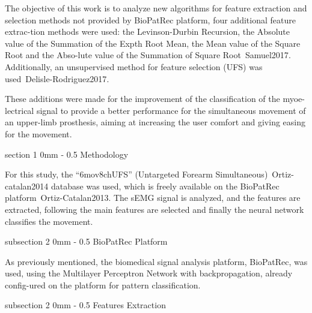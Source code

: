 \documentclass[a4paper, 12pt]{ppgeb}
\makeatletter
\renewcommand{\section}{\@startsection
{section}
{1}
{0mm}
{-\baselineskip}
{0.5\baselineskip}
{\large\bfseries\scshape}}
\renewcommand{\subsection}{\@startsection
{subsection}
{2}
{0mm}
{-\baselineskip}
{0.5\baselineskip}
{\bf\sffamily}}
\makeatother
\begin{document}
The objective of this work is to analyze new algorithms for feature extraction and selection methods not provided by BioPatRec platform, four additional feature extrac-tion methods were used: the Levinson-Durbin Recursion, the Absolute value of the Summation of the Expth Root Mean, the Mean value of the Square Root and the Abso-lute value of the Summation of Square Root~\cite{mainreferences}{Samuel2017}. Additionally, an unsupervised method for feature selection (UFS) was used~\cite{mainreferences}{Delisle-Rodriguez2017}.

These additions were made for the improvement of the classification of the myoe-lectrical signal to provide a better performance for the simultaneous movement of an upper-limb prosthesis, aiming at increasing the user comfort and giving easing for the movement.

\section{Methodology}

For this study, the “6mov8chUFS” (Untargeted Forearm Simultaneous)~\cite{mainreferences}{Ortiz-catalan2014} database was used, which is freely available on the BioPatRec platform~\cite{mainreferences}{Ortiz-Catalan2013}. The sEMG signal is analyzed, and the features are extracted, following the main features are selected and finally the neural network classifies the movement.

\subsection{BioPatRec Platform}

As previously mentioned, the biomedical signal analysis platform, BioPatRec, was used, using the Multilayer Perceptron Network with backpropagation, already config-ured on the platform for pattern classification.

\subsection{Features Extraction}
\end{document}
